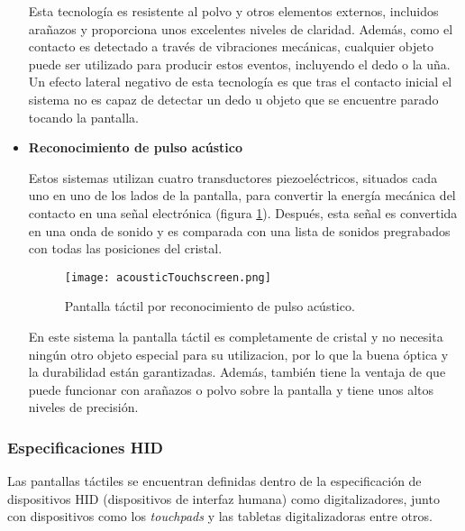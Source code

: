 \begin{itemize}
Esta tecnología es resistente al polvo y otros elementos externos, incluidos 
arañazos y proporciona unos excelentes niveles de claridad. Además, como 
el contacto es detectado a través de vibraciones mecánicas, cualquier objeto 
puede ser utilizado para producir estos eventos, incluyendo el dedo o la uña. 
Un efecto lateral negativo de esta tecnología es que tras el contacto inicial 
el sistema no es capaz de detectar un dedo u objeto que se encuentre parado 
tocando la pantalla.

\item \textbf{Reconocimiento de pulso acústico}

Estos sistemas utilizan cuatro transductores piezoeléctricos, situados cada uno 
en uno de los lados de la pantalla, para convertir la energía mecánica del 
contacto en una señal electrónica (figura \ref{fig:acousticTouchscreen}). 
Después, esta señal es convertida en una onda de sonido y es comparada con
una lista de sonidos pregrabados con todas las posiciones del cristal.

  \begin{figure}[H]
    \begin{center}
      \texttt{[image: acousticTouchscreen.png]}
      \caption{Pantalla táctil por reconocimiento de pulso acústico.}
      \label{fig:acousticTouchscreen}
    \end{center}
  \end{figure}

En este sistema la pantalla táctil es completamente de cristal y no necesita 
ningún otro objeto especial para su utilizacion, por lo que la buena óptica y 
la durabilidad están garantizadas. Además, también tiene la ventaja de que
puede funcionar con arañazos o polvo sobre la pantalla y tiene unos altos
niveles de precisión.
\end{itemize}

  \subsubsection{Especificaciones \acs{HID}}

Las pantallas táctiles se encuentran definidas dentro de la especificación de 
dispositivos \acs{HID} (dispositivos de interfaz humana) como digitalizadores, 
junto con dispositivos como los \emph{touchpads} y las tabletas digitalizadoras 
entre otros.
 
